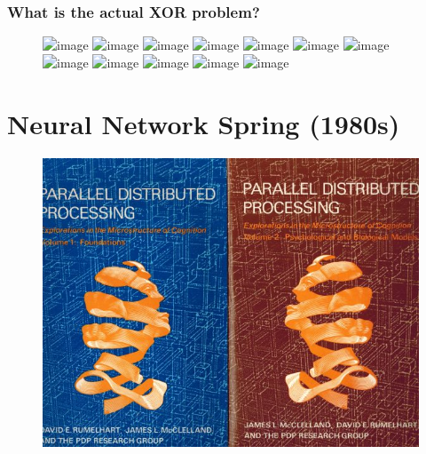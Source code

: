 \documentclass{beamer}
\begin{document}
\begin{frame}
    \frametitle{What is the actual XOR problem?}
    
    \begin{figure}[t]
        \includegraphics<1>[width=\textwidth]{figure/XOR_problem_flowchart/1.png}
        \includegraphics<2>[width=\textwidth]{figure/XOR_problem_flowchart/2.png}
        \includegraphics<3>[width=\textwidth]{figure/XOR_problem_flowchart/3.png}
        \includegraphics<5>[width=\textwidth]{figure/XOR_problem_flowchart/5.png}
        \includegraphics<4>[width=\textwidth]{figure/XOR_problem_flowchart/4.png}
        \includegraphics<6>[width=\textwidth]{figure/XOR_problem_flowchart/6.png}
        \includegraphics<7>[width=\textwidth]{figure/XOR_problem_flowchart/7.png}
        \includegraphics<8>[width=\textwidth]{figure/XOR_problem_flowchart/8.png}
        \includegraphics<9>[width=\textwidth]{figure/XOR_problem_flowchart/9.png}
        \includegraphics<10>[width=\textwidth]{figure/XOR_problem_flowchart/10.png}
        \includegraphics<11>[width=\textwidth]{figure/XOR_problem_flowchart/11.png}
        \includegraphics<12>[width=\textwidth]{figure/XOR_problem_flowchart/12.png}
    \end{figure}
\end{frame}

\section{Neural Network Spring (1980s)}

\begin{frame}
    \begin{figure}[t]
        \includegraphics[width=\textwidth]{figure/PDP_book.jpg}
    \centering
    \end{figure}
\end{frame}
\end{document}
